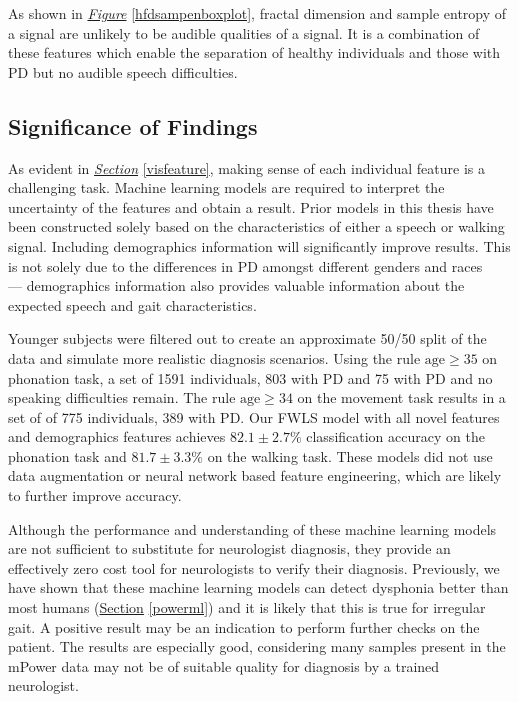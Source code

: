 \documentclass[12pt, twoside]{book}
\begin{document}
As shown in \textit{\hyperref[hfdsampenboxplot]{Figure}} \ref{hfdsampenboxplot}, fractal dimension and sample entropy of a signal are unlikely to be audible qualities of a signal. It is a combination of these features which enable the separation of healthy individuals and those with PD but no audible speech difficulties.

\subsection{Significance of Findings}

As evident in \textit{\hyperref[visfeature]{Section}} \ref{visfeature}, making sense of each individual feature is a challenging task. Machine learning models are required to interpret the uncertainty of the features and obtain a result. Prior models in this thesis have been constructed solely based on the characteristics of either a speech or walking signal. Including demographics information will significantly improve results. This is not solely due to the differences in PD amongst different genders and races ~\cite{gender,gendersymptoms,ageracial} --- demographics information also provides valuable information about the expected speech and gait characteristics.

Younger subjects were filtered out to create an approximate 50/50 split of the data and simulate more realistic diagnosis scenarios. Using the rule $\text{age}\geq35$ on phonation task, a set of 1591 individuals, 803 with PD and 75 with PD and no speaking difficulties remain. The rule $\text{age}\geq34$ on the movement task results in a set of of 775 individuals, 389 with PD. Our FWLS model with all novel features and demographics features achieves $82.1\pm2.7\%$ classification accuracy on the phonation task and $81.7\pm3.3\%$  on the walking task. These models did not use data augmentation or neural network based feature engineering, which are likely to further improve accuracy.

Although the performance and understanding of these machine learning models are not sufficient to substitute for neurologist diagnosis, they provide an effectively zero cost tool for neurologists to verify their diagnosis. Previously, we have shown that these machine learning models can detect dysphonia better than most humans (\hyperref[powerml]{Section} \ref{powerml}) and it is likely that this is true for irregular gait. A positive result may be an indication to perform further checks on the patient. The results are especially good, considering many samples present in the mPower data may not be of suitable quality for diagnosis by a trained neurologist.
\end{document}
